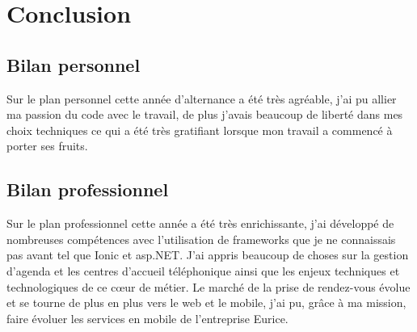\chapter{Conclusion}

\section{Bilan personnel}
Sur le plan personnel cette année d'alternance a été très agréable, j'ai pu allier ma 
passion du code avec le travail, de plus j'avais beaucoup de liberté dans mes choix 
techniques ce qui a été très gratifiant lorsque mon travail a commencé à porter ses fruits.

\section{Bilan professionnel}
Sur le plan professionnel cette année a été très enrichissante, j'ai développé de nombreuses 
compétences avec l'utilisation de frameworks que je ne connaissais pas avant tel que Ionic et asp.NET.
J'ai appris beaucoup de choses sur la gestion d'agenda et les centres d'accueil téléphonique ainsi que les enjeux 
techniques et technologiques de ce cœur de métier. \newline
Le marché de la prise de rendez-vous évolue et se tourne de plus en plus vers le 
web et le mobile, j'ai pu, grâce à ma mission, faire évoluer les services en mobile de
l'entreprise Eurice.